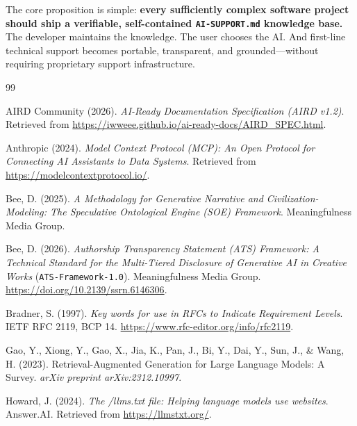 \documentclass[12pt, a4paper]{article}
\begin{document}
The core proposition is simple: \textbf{every sufficiently complex software project should ship a verifiable, self-contained \texttt{AI-SUPPORT.md} knowledge base.} The developer maintains the knowledge. The user chooses the AI. And first-line technical support becomes portable, transparent, and grounded---without requiring proprietary support infrastructure.



\newpage
\begingroup
{}
\renewcommand{\bibfont}{\small}
\setlength{\bibsep}{0.35em plus 0.1em minus 0.1em}

\begin{thebibliography}{99}

AIRD Community (2026). \textit{AI-Ready Documentation Specification (AIRD v1.2)}. Retrieved from \url{https://iwweee.github.io/ai-ready-docs/AIRD_SPEC.html}.

Anthropic (2024). \textit{Model Context Protocol (MCP): An Open Protocol for Connecting AI Assistants to Data Systems}. Retrieved from \url{https://modelcontextprotocol.io/}.

Bee, D. (2025). \textit{A Methodology for Generative Narrative and Civilization-Modeling: The Speculative Ontological Engine (SOE) Framework}. Meaningfulness Media Group.

Bee, D. (2026). \textit{Authorship Transparency Statement (ATS) Framework: A Technical Standard for the Multi-Tiered Disclosure of Generative AI in Creative Works} (\texttt{ATS-Framework-1.0}). Meaningfulness Media Group. \url{https://doi.org/10.2139/ssrn.6146306}.

Bradner, S. (1997). \textit{Key words for use in RFCs to Indicate Requirement Levels}. IETF RFC 2119, BCP 14. \url{https://www.rfc-editor.org/info/rfc2119}.

Gao, Y., Xiong, Y., Gao, X., Jia, K., Pan, J., Bi, Y., Dai, Y., Sun, J., \& Wang, H. (2023). Retrieval-Augmented Generation for Large Language Models: A Survey. \textit{arXiv preprint arXiv:2312.10997}.

Howard, J. (2024). \textit{The /llms.txt file: Helping language models use websites}. Answer.AI. Retrieved from \url{https://llmstxt.org/}.


\end{thebibliography}
\end{document}
